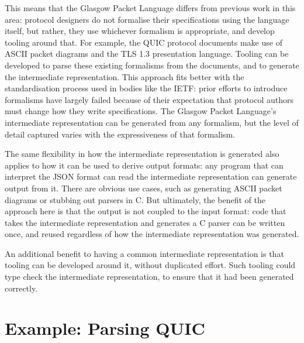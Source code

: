 \documentclass[10pt,sigconf]{acmart}
\begin{document}
This means that the Glasgow Packet Language differs from previous work in this area:
protocol designers do not formalise their specifications using the language itself, but
rather, they use whichever formalism is appropriate, and develop tooling around that. For
example, the QUIC protocol documents make use of ASCII packet diagrams and the TLS 1.3
presentation language. Tooling can be developed to parse these existing formalisms from
the documents, and to generate the intermediate representation. This approach fits better
with the standardisation process used in bodies like the IETF: prior efforts to introduce
formalisms have largely failed because of their expectation that protocol authors must
change how they write specifications. The Glasgow Packet Language's intermediate
representation can be generated from any formalism, but the level of detail captured
varies with the expressiveness of that formalism.

The same flexibility in how the intermediate representation is generated also applies to
how it can be used to derive output formats: any program that can interpret the JSON
format can read the intermediate representation can generate output from it. There are
obvious use cases, such as generating ASCII packet diagrams or stubbing out parsers in C.
But ultimately, the benefit of the approach here is that the output is not coupled to the
input format: code that takes the intermediate representation and generates a C parser can
be written once, and reused regardless of how the intermediate representation was
generated.

An additional benefit to having a common intermediate representation is that tooling can
be developed around it, without duplicated effort. Such tooling could type check the
intermediate representation, to ensure that it had been generated correctly.

\section{Example: Parsing QUIC}
\label{sec:casestudy}
\end{document}
